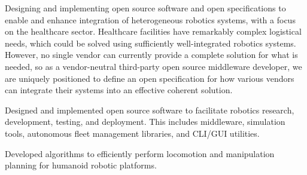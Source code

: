 \documentclass[10pt,a4paper,ragged2e]{altacv}
\begin{document}

\begin{fullwidth}
\makecvheader
\end{fullwidth}



Designing and implementing open source software and open specifications to enable and enhance integration of heterogeneous robotics systems, with a focus on the healthcare sector. Healthcare facilities have remarkably complex logistical needs, which could be solved using sufficiently well-integrated robotics systems. However, no single vendor can currently provide a complete solution for what is needed, so as a vendor-neutral third-party open source middleware developer, we are uniquely positioned to define an open specification for how various vendors can integrate their systems into an effective coherent solution. 

\divider

Designed and implemented open source software to facilitate robotics research, development, testing, and deployment. This includes middleware, simulation tools, autonomous fleet management libraries, and CLI/GUI utilities.

\divider

Developed algorithms to efficiently perform locomotion and manipulation planning for humanoid robotic platforms.
\end{document}
